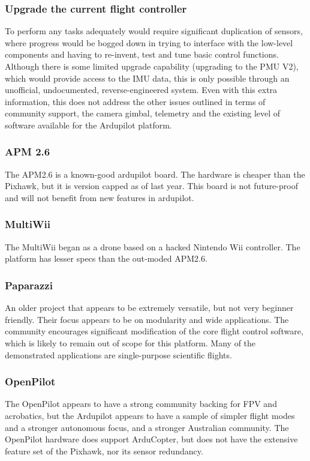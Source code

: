 \documentclass[a4paper, 11pt, titlepage]{article}
\begin{document}
\subsubsection{Upgrade the current flight controller}
To perform any tasks adequately would require significant duplication of sensors, where progress would be bogged down in trying to interface with the low-level components and having to re-invent, test and tune basic control functions. 
Although there is some limited upgrade capability (upgrading to the PMU V2), which would provide access to the IMU data, this is only possible through an unofficial, undocumented, reverse-engineered system. Even with this extra information, this does not address the other issues outlined in terms of community support, the camera gimbal, telemetry and the existing level of software available for the Ardupilot platform.
\subsubsection{APM 2.6}
The APM2.6 is a known-good ardupilot board. The hardware is cheaper than the Pixhawk, but it is version capped as of last year.  This board is not future-proof and will not benefit from new features in ardupilot.
\subsubsection{MultiWii}
The MultiWii began as a drone based on a hacked Nintendo Wii controller.  The platform has lesser specs than the out-moded APM2.6.
\subsubsection{Paparazzi}
An older project that appears to be extremely versatile, but not very beginner friendly.  Their focus appears to be on modularity and wide applications.  The community encourages significant modification of the core flight control software, which is likely to remain out of scope for this platform.   Many of the demonstrated applications are single-purpose scientific flights.
\subsubsection{OpenPilot}
The OpenPilot appears to have a strong community backing for FPV and acrobatics, but the Ardupilot appears to have a sample of simpler flight modes and a stronger autonomous focus, and a stronger Australian community.
The OpenPilot hardware does support ArduCopter, but does not have the extensive feature set of the Pixhawk, nor its sensor redundancy.
\end{document}
